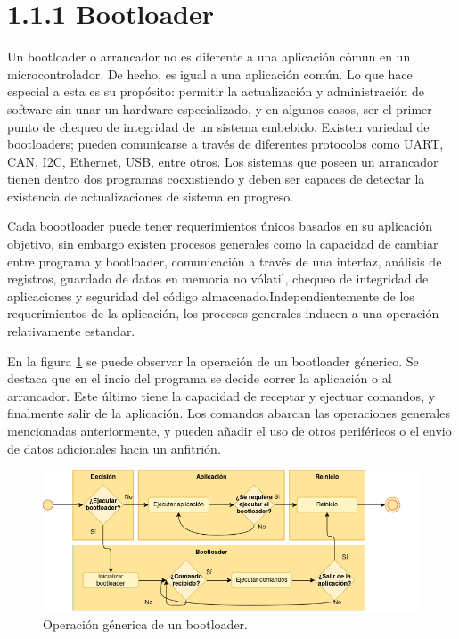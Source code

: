 \documentclass[
11pt, %
]{charter}
\begin{document}
\section{1.1.1 Bootloader}
\label{sec:edaBootloader}

Un bootloader o arrancador no es diferente a una aplicación cómun en un microcontrolador. De hecho, es igual a una aplicación común. Lo que hace especial a esta es su propósito: permitir la actualización y administración de software sin unar un hardware especializado, y en algunos casos, ser el primer punto de chequeo de integridad de un sistema embebido. Existen variedad de bootloaders; pueden comunicarse a través de diferentes protocolos como UART, CAN, I2C, Ethernet, USB, entre otros. Los sistemas que poseen un arrancador tienen dentro dos programas coexistiendo y deben ser capaces de detectar la existencia de actualizaciones de sistema en progreso.

Cada boootloader puede tener requerimientos únicos basados en su aplicación objetivo, sin embargo existen procesos generales como la capacidad de cambiar entre programa y bootloader, comunicación a través de una interfaz, análisis de registros, guardado de datos en memoria no vólatil, chequeo de integridad de aplicaciones y seguridad del código almacenado.Independientemente de los requerimientos de la aplicación, los procesos generales inducen a una operación relativamente estandar.

En la figura \ref{fig:bootloaderFlow} se puede observar la operación de un bootloader génerico. Se destaca que en el incio del programa se decide correr la aplicación o al arrancador. Este último tiene la capacidad de receptar y ejectuar comandos, y finalmente salir de la aplicación. Los comandos abarcan las operaciones generales mencionadas anteriormente, y pueden añadir el uso de otros periféricos o el envio de datos adicionales hacia un anfitrión.

\begin{figure}[htpb]
\centering 
\includegraphics[width=.99\textwidth]{./Figuras/GdP-diagrams-bootloader.png}
\caption{Operación génerica de un bootloader.}
\label{fig:bootloaderFlow}
\end{figure}
\end{document}
